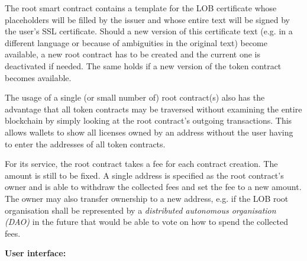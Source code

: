 \documentclass[a4paper]{article}
\begin{document}
The root smart contract contains a template for the LOB certificate whose placeholders will be filled by the issuer and whose entire text will be signed by the user's SSL certificate. Should a new version of this certificate text (e.g. in a different language or because of ambiguities in the original text) become available, a new root contract has to be created and the current one is deactivated if needed. The same holds if a new version of the token contract becomes available.

The usage of a single (or small number of) root contract(s) also has the advantage that all token contracts may be traversed without examining the entire blockchain by simply looking at the root contract's outgoing transactions. This allows wallets to show all licenses owned by an address without the user having to enter the addresses of all token contracts.

For its service, the root contract takes a fee for each contract creation. The amount is still to be fixed. 
A single address is specified as the root contract's owner and is able to withdraw the collected fees and set the fee to a new amount. The owner may also transfer ownership to a new address, e.g. if the LOB root organisation shall be represented by a \emph{distributed autonomous organisation (DAO)} in the future that would be able to vote on how to spend the collected fees.

\textbf{User interface:}
\end{document}
